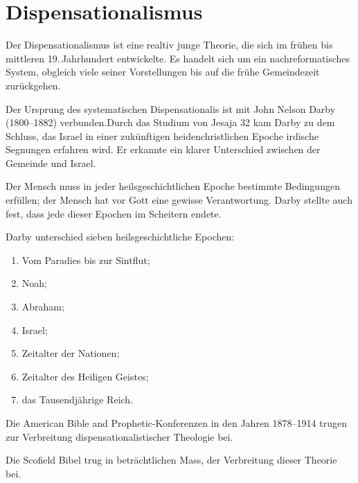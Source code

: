\documentclass{mybib}
\begin{document}
\section{Dispensationalismus}
    Der Dispensationalismus ist eine realtiv junge Theorie, die sich im frühen bis mittleren 19.\,Jahrhundert entwickelte. Es handelt sich um ein nachreformatisches System, obgleich viele seiner Vorstellungen bis auf 
die frühe Gemeindezeit zurückgehen.

Der Ursprung des systematischen Dispensationalis ist mit John Nelson Darby (1800–1882) verbunden.Durch das Studium von Jesaja 32 kam Darby zu dem Schluss, das Israel in einer zukünftigen heidenchristlichen Epoche irdische Segnungen erfahren wird. Er erkannte ein klarer Unterschied zwischen der Gemeinde und Israel.

Der Mensch muss in jeder heilsgeschichtlichen Epoche bestimmte Bedingungen erfüllen; der Mensch hat vor Gott eine gewisse Verantwortung. Darby stellte auch fest, dass jede dieser Epochen im Scheitern endete.

Darby unterschied sieben heilsgeschichtliche Epochen: 
\begin{enumerate}
    \item Vom Paradies bis zur Sintflut;
    \item Noah;
    \item Abraham;
    \item Israel;
    \item Zeitalter der Nationen;
    \item Zeitalter des Heiligen Geistes;
    \item das Tausendjährige Reich.
\end{enumerate}
Die American Bible and Prophetic-Konferenzen in den Jahren 1878–1914 trugen zur Verbreitung dispensationalistischer Theologie bei.

Die Scofield Bibel trug in beträchtlichen Mass, der Verbreitung dieser Theorie bei.
\end{document}
